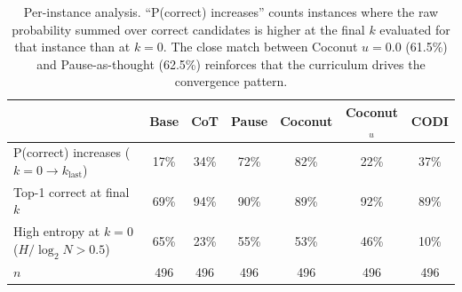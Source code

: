 \begin{table}[h!]
\centering
\small
\caption{Per-instance analysis. ``P(correct) increases'' counts instances where the raw probability summed over correct candidates is higher at the final $k$ evaluated for that instance than at $k{=}0$. The close match between Coconut $u{=}0.0$ (61.5\%) and Pause-as-thought (62.5\%) reinforces that the curriculum drives the convergence pattern.}
\begin{tabular}{l cccccc}
\toprule
 & Base & CoT & Pause & Coconut & Coconut$_{u}$ & CODI \\
\midrule
P(correct) increases ($k{=}0 \to k_{\text{last}}$) & 17\% & 34\% & 72\% & 82\% & 22\% & 37\% \\
Top-1 correct at final $k$ & 69\% & 94\% & 90\% & 89\% & 92\% & 89\% \\
High entropy at $k{=}0$ ($H/\log_2 N > 0.5$) & 65\% & 23\% & 55\% & 53\% & 46\% & 10\% \\
\midrule
$n$ & 496 & 496 & 496 & 496 & 496 & 496 \\
\bottomrule
\end{tabular}
\label{tab:per_instance_statistics}
\end{table}
